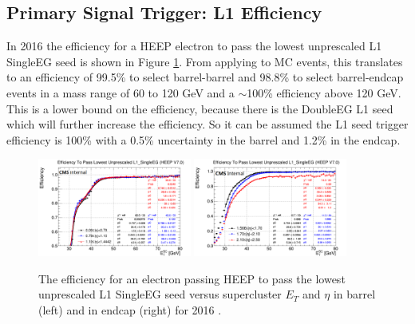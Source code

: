\subsection{Primary Signal Trigger: L1 Efficiency}\label{sec:L1_trigger_efficiency}
In 2016 the efficiency for a HEEP electron to pass the lowest unprescaled L1 SingleEG seed is shown in Figure \ref{fig:L1_eff_2016}. From applying to MC events, this translates to an efficiency of 99.5\% to select barrel-barrel and 98.8\% to select barrel-endcap events in a mass range of 60 to 120 GeV and a $\sim$100\% efficiency above 120 GeV. This is a lower bound on the efficiency, because there is the DoubleEG L1 seed which will further increase the efficiency. So it can be assumed the L1 seed trigger efficiency is 100\% with a 0.5\% uncertainty in the barrel and 1.2\% in the endcap.
\begin{figure}[h!]
\begin{center}
\includegraphics[width=0.45\textwidth]{figures/Zprime/2016/trigger/l1SingleEGEffEB.png}
\includegraphics[width=0.45\textwidth]{figures/Zprime/2016/trigger/l1SingleEGEffEE.png}
\caption{The efficiency for an electron passing HEEP to pass the lowest unprescaled L1 SingleEG seed versus supercluster $E_{T}$ and $\eta$ in barrel (left) and in endcap (right) for 2016 \cite{CMS-AN-2016-404}.}
\label{fig:L1_eff_2016}
\end{center}
\end{figure}

